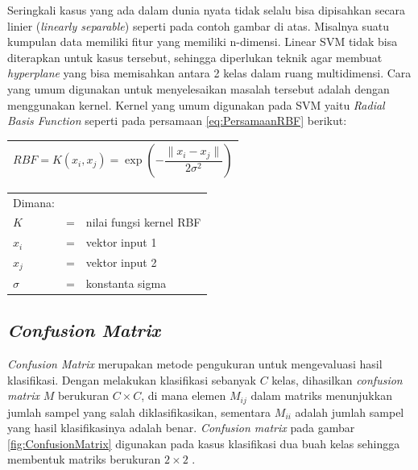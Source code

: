 \noindent Seringkali kasus yang ada dalam dunia nyata tidak selalu bisa dipisahkan secara linier (\textit{linearly separable}) seperti pada contoh gambar di atas. Misalnya suatu kumpulan data memiliki fitur yang memiliki n-dimensi. Linear SVM tidak bisa diterapkan untuk kasus tersebut, sehingga diperlukan teknik agar membuat \textit{hyperplane} yang bisa memisahkan antara 2 kelas dalam ruang multidimensi. Cara yang umum digunakan untuk menyelesaikan masalah tersebut adalah dengan menggunakan kernel. Kernel yang umum digunakan pada SVM yaitu \textit{Radial Basis Function} seperti pada persamaan \ref{eq:PersamaanRBF} berikut:

\begin{table}[H]
	\small
	\begin{adjustbox}{width=1\textwidth}
		\begin{tabular}{|p{13.55cm}|}
			\hline
			\begin{equation}
			RBF = K(x_i,x_j) = \exp (-\frac{\|x_i-x_j\|}{2\sigma^2})
			\label{eq:PersamaanRBF}
			\end{equation}\\
			\hline
		\end{tabular}
	\end{adjustbox}
\end{table}
\noindent
\renewcommand{\arraystretch}{1} 
\begin{tabularx}{\textwidth}{lll}
	Dimana: \\
	$K$ & = & nilai fungsi kernel RBF\\
	$x_i$ & = & vektor input 1\\
	$x_j$ & = & vektor input 2\\
	$\sigma$ & = & konstanta sigma\\
\end{tabularx}
\vspace{4.5pt}

\subsection{\textit{Confusion Matrix}}
\noindent \textit{Confusion Matrix} merupakan metode pengukuran untuk mengevaluasi hasil klasifikasi. Dengan melakukan klasifikasi sebanyak $C$ kelas, dihasilkan \textit{confusion matrix} $M$ berukuran $C \times C$, di mana elemen $M_{ij}$ dalam matriks menunjukkan jumlah sampel yang salah diklasifikasikan, sementara $M_{ii}$ adalah jumlah sampel yang hasil klasifikasinya adalah benar. \textit{Confusion matrix} pada gambar \ref{fig:ConfusionMatrix} digunakan pada kasus klasifikasi dua buah kelas sehingga membentuk matriks berukuran $2 \times 2$ \cite{markham}.

